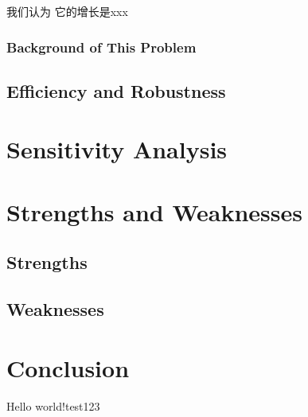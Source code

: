 \documentclass[a4paper]{article}
\begin{document}
我们认为 它的增长是xxx
\subsubsection{Background of This Problem}
\subsection{Efficiency and Robustness}
\section{Sensitivity Analysis}
\section{Strengths and Weaknesses}
\subsection{Strengths}
\subsection{Weaknesses}
\section{Conclusion}
Hello world!test123
\end{document}
